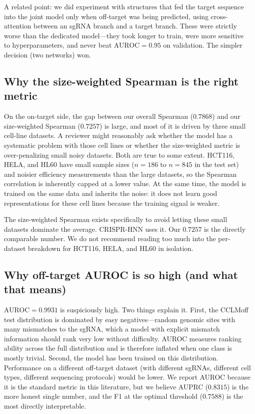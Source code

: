 \documentclass[11pt,a4paper]{article}
\begin{document}
A related point: we did experiment with structures that fed the target sequence into the joint model only when off-target was being predicted, using cross-attention between an sgRNA branch and a target branch. These were strictly worse than the dedicated model---they took longer to train, were more sensitive to hyperparameters, and never beat $\mathrm{AUROC}=0.95$ on validation. The simpler decision (two networks) won.

\subsection{Why the size-weighted Spearman is the right metric}

On the on-target side, the gap between our overall Spearman ($0.7868$) and our size-weighted Spearman ($0.7257$) is large, and most of it is driven by three small cell-line datasets. A reviewer might reasonably ask whether the model has a systematic problem with those cell lines or whether the size-weighted metric is over-penalizing small noisy datasets. Both are true to some extent. HCT116, HELA, and HL60 have small sample sizes ($n{=}186$ to $n{=}845$ in the test set) and noisier efficiency measurements than the large datasets, so the Spearman correlation is inherently capped at a lower value. At the same time, the model is trained on the same data and inherits the noise: it does not learn good representations for these cell lines because the training signal is weaker.

The size-weighted Spearman exists specifically to avoid letting these small datasets dominate the average. CRISPR-HNN uses it. Our $0.7257$ is the directly comparable number. We do not recommend reading too much into the per-dataset breakdown for HCT116, HELA, and HL60 in isolation.

\subsection{Why off-target AUROC is so high (and what that means)}

$\mathrm{AUROC}=0.9931$ is suspiciously high. Two things explain it. First, the CCLMoff test distribution is dominated by easy negatives---random genomic sites with many mismatches to the sgRNA, which a model with explicit mismatch information should rank very low without difficulty. AUROC measures ranking ability across the full distribution and is therefore inflated when one class is mostly trivial. Second, the model has been trained on this distribution. Performance on a different off-target dataset (with different sgRNAs, different cell types, different sequencing protocols) would be lower. We report AUROC because it is the standard metric in this literature, but we believe AUPRC ($0.8315$) is the more honest single number, and the F1 at the optimal threshold ($0.7588$) is the most directly interpretable.
\end{document}
